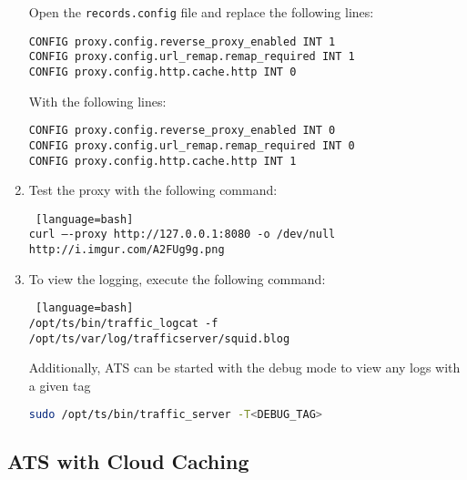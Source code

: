 \begin{enumerate}
Open the \verb|records.config| file and replace the following lines:

\begin{verbatim}
CONFIG proxy.config.reverse_proxy_enabled INT 1
CONFIG proxy.config.url_remap.remap_required INT 1
CONFIG proxy.config.http.cache.http INT 0
\end{verbatim}

With the following lines:

\begin{verbatim}
CONFIG proxy.config.reverse_proxy_enabled INT 0
CONFIG proxy.config.url_remap.remap_required INT 0
CONFIG proxy.config.http.cache.http INT 1
\end{verbatim}

\item Test the proxy with the following command:

\begin{lstlisting} [language=bash] 
curl —-proxy http://127.0.0.1:8080 -o /dev/null http://i.imgur.com/A2FUg9g.png
\end{lstlisting}

\item To view the logging, execute the following command:

\begin{lstlisting} [language=bash] 
/opt/ts/bin/traffic_logcat -f /opt/ts/var/log/trafficserver/squid.blog
\end{lstlisting}

Additionally, ATS can be started with the debug mode to view any logs with a given tag

\begin{lstlisting}[language=bash]
sudo /opt/ts/bin/traffic_server -T<DEBUG_TAG>
\end{lstlisting}


\end{enumerate}

\subsection{ATS with Cloud Caching}

